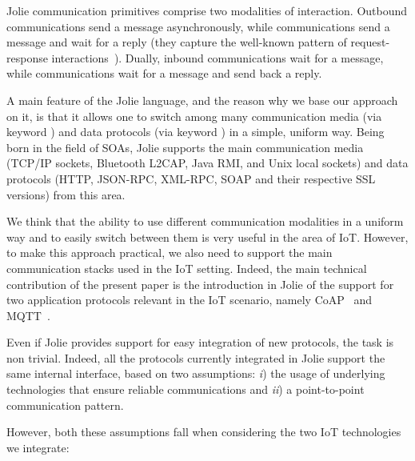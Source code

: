 Jolie communication primitives comprise two modalities of
interaction. Outbound  communications send a message
asynchronously, while  communications send a message
and wait for a reply (they capture the well-known pattern of request-response
interactions~\cite{req-rep}). Dually, inbound 
communications wait for a message, while 
communications wait for a message and send back a reply.

A main feature of the Jolie language, and the reason why we base our approach on
it, is that it allows one to switch among many communication media (via keyword
) and data protocols (via keyword ) in a simple,
uniform way.
%
Being born in the field of SOAs, Jolie supports the main communication media
(TCP/IP sockets, Bluetooth L2CAP, Java RMI, and Unix local sockets) and data
protocols (HTTP, JSON-RPC, XML-RPC, SOAP and their respective SSL versions) from
this area.

We think that the ability to use different communication modalities in a uniform
way and to easily switch between them is very useful in the area of IoT.
However, to make this approach practical, we also need to support the main
communication stacks used in the IoT setting. Indeed, the main technical
contribution of the present paper is the introduction in Jolie of the support
for two application protocols relevant in the IoT scenario, namely
CoAP~\cite{doi:10.17487/RFC7252,coap} and MQTT~\cite{mqtt-v3.1.1,mqtt}.

Even if Jolie provides support for easy integration of new protocols, the task
is non trivial. Indeed, all the protocols currently integrated in Jolie 
support the same internal interface, based on two assumptions:
\emph{i}) the usage of underlying technologies that ensure reliable
communications and \emph{ii}) a point-to-point communication pattern.

However, both these assumptions fall when considering the two IoT technologies
we integrate:

